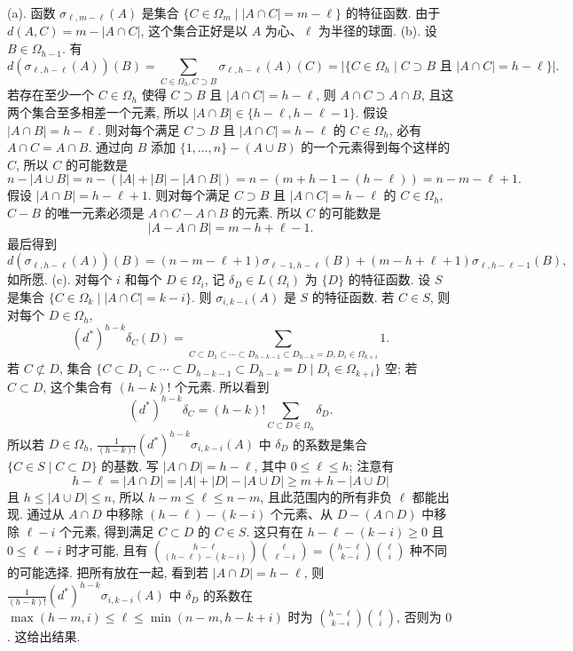 \begin{solution}
(a). 函数 $\sigma_{\ell,m-\ell}(A)$ 是集合 $\{C \in \Omega_m \mid |A \cap C| = m - \ell\}$ 的特征函数. 由于 $d(A, C) = m - |A \cap C|$, 这个集合正好是以 $A$ 为心、$\ell$ 为半径的球面.
(b). 设 $B \in \Omega_{h-1}$. 有
\[
d(\sigma_{\ell,h-\ell}(A))(B) = \sum_{C \in \Omega_h, C \supset B}\sigma_{\ell,h-\ell}(A)(C) = |\{C \in \Omega_h \mid C \supset B \text{ 且 } |A \cap C| = h - \ell\}|.
\]
若存在至少一个 $C \in \Omega_h$ 使得 $C \supset B$ 且 $|A \cap C| = h - \ell$, 则 $A \cap C \supset A \cap B$, 且这两个集合至多相差一个元素, 所以 $|A \cap B| \in \{h - \ell, h - \ell - 1\}$.
假设 $|A \cap B| = h - \ell$. 则对每个满足 $C \supset B$ 且 $|A \cap C| = h - \ell$ 的 $C \in \Omega_h$, 必有 $A \cap C = A \cap B$. 通过向 $B$ 添加 $\{1, \ldots, n\} - (A \cup B)$ 的一个元素得到每个这样的 $C$, 所以 $C$ 的可能数是
\[
n - |A \cup B| = n - (|A| + |B| - |A \cap B|) = n - (m + h - 1 - (h - \ell)) = n - m - \ell + 1.
\]
假设 $|A \cap B| = h - \ell + 1$. 则对每个满足 $C \supset B$ 且 $|A \cap C| = h - \ell$ 的 $C \in \Omega_h$, $C - B$ 的唯一元素必须是 $A \cap C - A \cap B$ 的元素. 所以 $C$ 的可能数是
\[
|A - A \cap B| = m - h + \ell - 1.
\]
最后得到
\[
d(\sigma_{\ell,h-\ell}(A))(B) = (n - m - \ell + 1)\sigma_{\ell-1,h-\ell}(B) + (m - h + \ell + 1)\sigma_{\ell,h-\ell-1}(B),
\]
如所愿.
(c). 对每个 $i$ 和每个 $D \in \Omega_i$, 记 $\delta_D \in L(\Omega_i)$ 为 $\{D\}$ 的特征函数. 设 $S$ 是集合 $\{C \in \Omega_k \mid |A \cap C| = k - i\}$. 则 $\sigma_{i,k-i}(A)$ 是 $S$ 的特征函数. 若 $C \in S$, 则对每个 $D \in \Omega_h$,
\[
(d^*)^{h-k}\delta_C(D) = \sum_{C \subset D_1 \subset \cdots \subset D_{h-k-1} \subset D_{h-k} = D, D_i \in \Omega_{k+i}}1.
\]
若 $C \not\subset D$, 集合 $\{C \subset D_1 \subset \cdots \subset D_{h-k-1} \subset D_{h-k} = D \mid D_i \in \Omega_{k+i}\}$ 空; 若 $C \subset D$, 这个集合有 $(h-k)!$ 个元素. 所以看到
\[
(d^*)^{h-k}\delta_C = (h-k)!\sum_{C \subset D \in \Omega_h}\delta_D.
\]
所以若 $D \in \Omega_h$, $\frac{1}{(h-k)!}(d^*)^{h-k}\sigma_{i,k-i}(A)$ 中 $\delta_D$ 的系数是集合 $\{C \in S \mid C \subset D\}$ 的基数. 写 $|A \cap D| = h - \ell$, 其中 $0 \leq \ell \leq h$; 注意有
\[
h - \ell = |A \cap D| = |A| + |D| - |A \cup D| \geq m + h - |A \cup D|
\]
且 $h \leq |A \cup D| \leq n$, 所以 $h - m \leq \ell \leq n - m$, 且此范围内的所有非负 $\ell$ 都能出现. 通过从 $A \cap D$ 中移除 $(h - \ell) - (k - i)$ 个元素、从 $D - (A \cap D)$ 中移除 $\ell - i$ 个元素, 得到满足 $C \subset D$ 的 $C \in S$. 这只有在 $h - \ell - (k - i) \geq 0$ 且 $0 \leq \ell - i$ 时才可能, 且有 $\binom{h-\ell}{(h-\ell)-(k-i)}\binom{\ell}{\ell-i} = \binom{h-\ell}{k-i}\binom{\ell}{i}$ 种不同的可能选择. 把所有放在一起, 看到若 $|A \cap D| = h - \ell$, 则 $\frac{1}{(h-k)!}(d^*)^{h-k}\sigma_{i,k-i}(A)$ 中 $\delta_D$ 的系数在 $\max(h-m, i) \leq \ell \leq \min(n-m, h-k+i)$ 时为 $\binom{h-\ell}{k-i}\binom{\ell}{i}$, 否则为 $0$. 这给出结果.

\end{solution}
